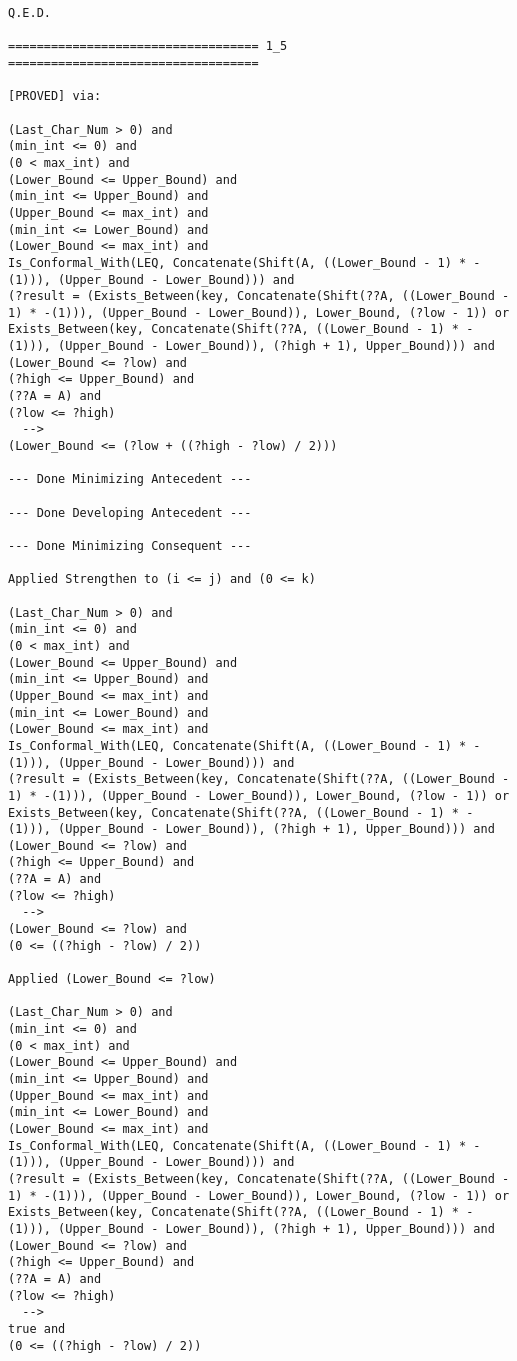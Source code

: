 \begin{lstlisting}[language=resolve]
Q.E.D.

=================================== 1_5 ===================================

[PROVED] via:

(Last_Char_Num > 0) and
(min_int <= 0) and
(0 < max_int) and
(Lower_Bound <= Upper_Bound) and
(min_int <= Upper_Bound) and
(Upper_Bound <= max_int) and
(min_int <= Lower_Bound) and
(Lower_Bound <= max_int) and
Is_Conformal_With(LEQ, Concatenate(Shift(A, ((Lower_Bound - 1) * -(1))), (Upper_Bound - Lower_Bound))) and
(?result = (Exists_Between(key, Concatenate(Shift(??A, ((Lower_Bound - 1) * -(1))), (Upper_Bound - Lower_Bound)), Lower_Bound, (?low - 1)) or Exists_Between(key, Concatenate(Shift(??A, ((Lower_Bound - 1) * -(1))), (Upper_Bound - Lower_Bound)), (?high + 1), Upper_Bound))) and
(Lower_Bound <= ?low) and
(?high <= Upper_Bound) and
(??A = A) and
(?low <= ?high)
  -->
(Lower_Bound <= (?low + ((?high - ?low) / 2)))

--- Done Minimizing Antecedent ---

--- Done Developing Antecedent ---

--- Done Minimizing Consequent ---

Applied Strengthen to (i <= j) and (0 <= k)

(Last_Char_Num > 0) and
(min_int <= 0) and
(0 < max_int) and
(Lower_Bound <= Upper_Bound) and
(min_int <= Upper_Bound) and
(Upper_Bound <= max_int) and
(min_int <= Lower_Bound) and
(Lower_Bound <= max_int) and
Is_Conformal_With(LEQ, Concatenate(Shift(A, ((Lower_Bound - 1) * -(1))), (Upper_Bound - Lower_Bound))) and
(?result = (Exists_Between(key, Concatenate(Shift(??A, ((Lower_Bound - 1) * -(1))), (Upper_Bound - Lower_Bound)), Lower_Bound, (?low - 1)) or Exists_Between(key, Concatenate(Shift(??A, ((Lower_Bound - 1) * -(1))), (Upper_Bound - Lower_Bound)), (?high + 1), Upper_Bound))) and
(Lower_Bound <= ?low) and
(?high <= Upper_Bound) and
(??A = A) and
(?low <= ?high)
  -->
(Lower_Bound <= ?low) and
(0 <= ((?high - ?low) / 2))

Applied (Lower_Bound <= ?low)

(Last_Char_Num > 0) and
(min_int <= 0) and
(0 < max_int) and
(Lower_Bound <= Upper_Bound) and
(min_int <= Upper_Bound) and
(Upper_Bound <= max_int) and
(min_int <= Lower_Bound) and
(Lower_Bound <= max_int) and
Is_Conformal_With(LEQ, Concatenate(Shift(A, ((Lower_Bound - 1) * -(1))), (Upper_Bound - Lower_Bound))) and
(?result = (Exists_Between(key, Concatenate(Shift(??A, ((Lower_Bound - 1) * -(1))), (Upper_Bound - Lower_Bound)), Lower_Bound, (?low - 1)) or Exists_Between(key, Concatenate(Shift(??A, ((Lower_Bound - 1) * -(1))), (Upper_Bound - Lower_Bound)), (?high + 1), Upper_Bound))) and
(Lower_Bound <= ?low) and
(?high <= Upper_Bound) and
(??A = A) and
(?low <= ?high)
  -->
true and
(0 <= ((?high - ?low) / 2))


\end{lstlisting}

